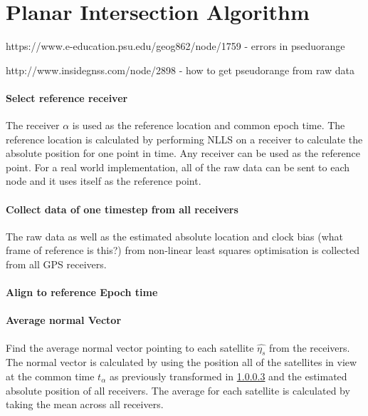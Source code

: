 \section{Planar Intersection Algorithm}


https://www.e-education.psu.edu/geog862/node/1759 - errors in pseduorange

http://www.insidegnss.com/node/2898 - how to get pseudorange from raw data


\paragraph{Select reference receiver}
The receiver $\alpha$ is used as the reference location and common epoch time. The reference location is calculated by performing NLLS on a receiver to calculate the absolute position for one point in time. Any receiver can be used as the reference point. For a real world implementation, all of the raw data can be sent to each node and it uses itself as the reference point.
\paragraph{Collect data of one timestep from all receivers}
The raw data as well as the estimated absolute location and clock bias (what frame of reference is this?) from non-linear least squares optimisation is collected from all GPS receivers.
\paragraph{Align to reference Epoch time}\label{timetransform}




\paragraph{Average normal Vector}
Find the average normal vector pointing to each satellite $\hat{\eta_s}$ from the receivers. The normal vector is calculated by using the position all of the satellites in view at the common time $t_{\alpha}$ as previously transformed in \ref{timetransform} and the estimated absolute position of all receivers. The average for each satellite is calculated by taking the mean across all receivers.

